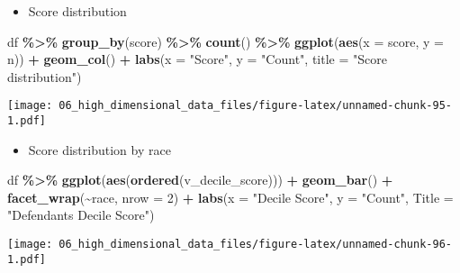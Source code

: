 \documentclass[
]{book}
\newenvironment{Shaded}{\begin{snugshade}}{\end{snugshade}}
\newcommand{\DataTypeTok}[1]{\textcolor[rgb]{0.13,0.29,0.53}{#1}}
\newcommand{\DecValTok}[1]{\textcolor[rgb]{0.00,0.00,0.81}{#1}}
\newcommand{\KeywordTok}[1]{\textcolor[rgb]{0.13,0.29,0.53}{\textbf{#1}}}
\newcommand{\NormalTok}[1]{#1}
\newcommand{\OperatorTok}[1]{\textcolor[rgb]{0.81,0.36,0.00}{\textbf{#1}}}
\newcommand{\StringTok}[1]{\textcolor[rgb]{0.31,0.60,0.02}{#1}}
\providecommand{\tightlist}{%
  \setlength{\itemsep}{0pt}\setlength{\parskip}{0pt}}
\begin{document}
\begin{itemize}
\tightlist
\item
  Score distribution
\end{itemize}

\begin{Shaded}
\begin{Highlighting}[]
\NormalTok{df }\OperatorTok{\%\textgreater{}\%}
\StringTok{  }\KeywordTok{group\_by}\NormalTok{(score) }\OperatorTok{\%\textgreater{}\%}
\StringTok{  }\KeywordTok{count}\NormalTok{() }\OperatorTok{\%\textgreater{}\%}
\StringTok{  }\KeywordTok{ggplot}\NormalTok{(}\KeywordTok{aes}\NormalTok{(}\DataTypeTok{x =}\NormalTok{ score, }\DataTypeTok{y =}\NormalTok{ n)) }\OperatorTok{+}
\StringTok{    }\KeywordTok{geom\_col}\NormalTok{() }\OperatorTok{+}
\StringTok{    }\KeywordTok{labs}\NormalTok{(}\DataTypeTok{x =} \StringTok{"Score"}\NormalTok{,}
         \DataTypeTok{y =} \StringTok{"Count"}\NormalTok{,}
         \DataTypeTok{title =} \StringTok{"Score distribution"}\NormalTok{)}
\end{Highlighting}
\end{Shaded}

\texttt{[image: 06\_high\_dimensional\_data\_files/figure-latex/unnamed-chunk-95-1.pdf]}

\begin{itemize}
\tightlist
\item
  Score distribution by race
\end{itemize}

\begin{Shaded}
\begin{Highlighting}[]
\NormalTok{df }\OperatorTok{\%\textgreater{}\%}
\StringTok{  }\KeywordTok{ggplot}\NormalTok{(}\KeywordTok{aes}\NormalTok{(}\KeywordTok{ordered}\NormalTok{(v\_decile\_score))) }\OperatorTok{+}\StringTok{ }
\StringTok{          }\KeywordTok{geom\_bar}\NormalTok{() }\OperatorTok{+}
\StringTok{          }\KeywordTok{facet\_wrap}\NormalTok{(}\OperatorTok{\textasciitilde{}}\NormalTok{race, }\DataTypeTok{nrow =} \DecValTok{2}\NormalTok{) }\OperatorTok{+}
\StringTok{          }\KeywordTok{labs}\NormalTok{(}\DataTypeTok{x =} \StringTok{"Decile Score"}\NormalTok{,}
               \DataTypeTok{y =} \StringTok{"Count"}\NormalTok{,}
               \DataTypeTok{Title =} \StringTok{"Defendant\textquotesingle{}s Decile Score"}\NormalTok{)}
\end{Highlighting}
\end{Shaded}

\texttt{[image: 06\_high\_dimensional\_data\_files/figure-latex/unnamed-chunk-96-1.pdf]}
\end{document}
